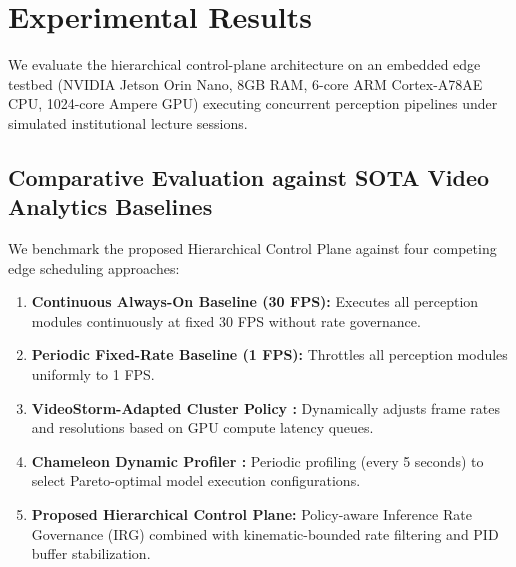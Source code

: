 \documentclass[conference]{IEEEtran}
\begin{document}
\section{Experimental Results}

We evaluate the hierarchical control-plane architecture on an embedded edge testbed (NVIDIA Jetson Orin Nano, 8GB RAM, 6-core ARM Cortex-A78AE CPU, 1024-core Ampere GPU) executing concurrent perception pipelines under simulated institutional lecture sessions.

\subsection{Comparative Evaluation against SOTA Video Analytics Baselines}
We benchmark the proposed Hierarchical Control Plane against four competing edge scheduling approaches:
\begin{enumerate}
    \item \textbf{Continuous Always-On Baseline (30 FPS):} Executes all perception modules continuously at fixed 30 FPS without rate governance.
    \item \textbf{Periodic Fixed-Rate Baseline (1 FPS):} Throttles all perception modules uniformly to 1 FPS.
    \item \textbf{VideoStorm-Adapted Cluster Policy \cite{b33}:} Dynamically adjusts frame rates and resolutions based on GPU compute latency queues.
    \item \textbf{Chameleon Dynamic Profiler \cite{b34}:} Periodic profiling (every 5 seconds) to select Pareto-optimal model execution configurations.
    \item \textbf{Proposed Hierarchical Control Plane:} Policy-aware Inference Rate Governance (IRG) combined with kinematic-bounded rate filtering and PID buffer stabilization.
\end{enumerate}
\end{document}
